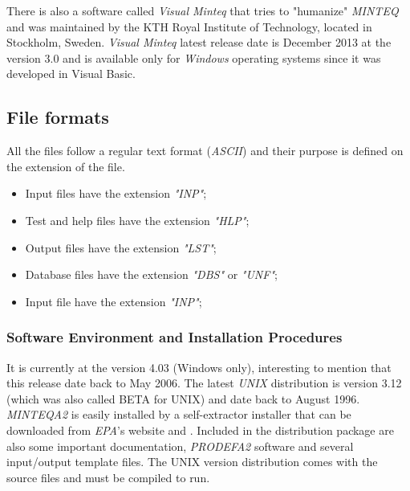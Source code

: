 There is also a software called \emph{Visual Minteq} that tries to "humanize" \emph{MINTEQ} and was maintained by the KTH Royal Institute of Technology, located in Stockholm, Sweden. \emph{Visual Minteq} latest release date is December 2013 at the version 3.0 and is available only for \emph{Windows} operating systems since it was developed in Visual Basic. 

\subsection{File formats}
All the files follow a regular text format (\emph{ASCII}) and their purpose is defined on the extension of the file. 
\begin{itemize}
\item Input files have the extension \emph{"INP"};
\item Test and help files have the extension \emph{"HLP"};
\item Output files have the extension \emph{"LST"};
\item Database files have the extension \emph{"DBS"} or \emph{"UNF"};
\item Input file have the extension \emph{"INP"};
\end{itemize}


\subsubsection{Software Environment and Installation Procedures}
It is currently at the version 4.03 (Windows only), interesting to mention that this release date back to May 2006. The latest \emph{UNIX} distribution is version 3.12 (which was also called BETA for UNIX) and date back to August 1996.
\emph{MINTEQA2} is easily installed by a self-extractor installer that can be downloaded from \emph{EPA}'s website \cite{minteq:website} and \cite{minteq:unix}. Included in the distribution package are also some important documentation, \emph{PRODEFA2} software and several input/output template files.
The UNIX version distribution comes with the source files and must be compiled to run.



